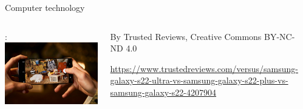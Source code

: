 \begin{frame}[t]{Computer technology}
\begin{columns}[T]
: \\
\includegraphics[height=.6\textheight]{images/samsung-s22.jpg}\\
\begin{tiny}
By Trusted Reviews, Creative Commons BY-NC-ND 4.0\\
{\begin{spacing}{1.0}
\url{https://www.trustedreviews.com/versus/samsung-galaxy-s22-ultra-vs-samsung-galaxy-s22-plus-vs-samsung-galaxy-s22-4207904}
\end{spacing}}
\end{tiny}

\\

\end{columns}

\end{frame}


